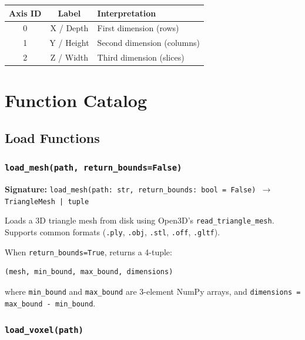 \documentclass[12pt,a4paper]{article}
\begin{document}
\begin{table}[H]
\centering
\begin{tabular}{ccl}
\toprule
\textbf{Axis ID} & \textbf{Label} & \textbf{Interpretation} \\
\midrule
0 & X / Depth & First dimension (rows) \\
1 & Y / Height & Second dimension (columns) \\
2 & Z / Width & Third dimension (slices) \\
\bottomrule
\end{tabular}
\end{table}

\newpage

\section{Function Catalog}

\subsection{Load Functions}

\subsubsection{\texttt{load\_mesh(path, return\_bounds=False)}}

\textbf{Signature:} \texttt{load\_mesh(path: str, return\_bounds: bool = False) $\rightarrow$ TriangleMesh | tuple}

Loads a 3D triangle mesh from disk using Open3D's \texttt{read\_triangle\_mesh}. Supports common formats (\texttt{.ply}, \texttt{.obj}, \texttt{.stl}, \texttt{.off}, \texttt{.gltf}).

When \texttt{return\_bounds=True}, returns a 4-tuple:
\begin{lstlisting}
(mesh, min_bound, max_bound, dimensions)
\end{lstlisting}
where \texttt{min\_bound} and \texttt{max\_bound} are 3-element NumPy arrays, and \texttt{dimensions = max\_bound - min\_bound}.

\subsubsection{\texttt{load\_voxel(path)}}
\end{document}
